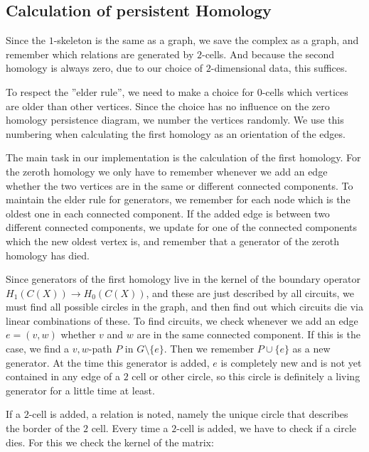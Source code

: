 \documentclass[11pt, a4paper, UKenglish]{article}
\begin{document}
    \subsection{Calculation of persistent Homology}\label{subsec:calculation-of-persistent-homology}

    Since the $1$-skeleton is the same as a graph, we save the complex as a graph, and remember which relations are generated by $2$-cells.
    And because the second homology is always zero, due to our choice of $2$-dimensional data, this suffices.

    To respect the ''elder rule'', we need to make a choice for $0$-cells which vertices are older than other vertices.
    Since the choice has no influence on the zero homology persistence diagram, we number the vertices randomly.
    We use this numbering when calculating the first homology as an orientation of the edges.

    The main task in our implementation is the calculation of the first homology.
    For the zeroth homology we only have to remember whenever we add an edge whether the two vertices are in the same or different connected components.
    To maintain the elder rule for generators, we remember for each node which is the oldest one in each connected component.
    If the added edge is between two different connected components, we update for one of the connected components which the new oldest vertex is, and remember that a generator of the zeroth homology has died.

    Since generators of the first homology live in the kernel of the boundary operator $H_1(C(X))\rightarrow H_0(C(X))$, and these are just described by all circuits, we must find all possible circles in the graph, and then find out which circuits die via linear combinations of these.
    To find circuits, we check whenever we add an edge $e=(v,w)$ whether $v$ and $w$ are in the same connected component.
    If this is the case, we find a $v,w$-path $P$ in $G\setminus \{e\}$.
    Then we remember $P\cup \{e\}$ as a new generator.
    At the time this generator is added, $e$ is completely new and is not yet contained in any edge of a $2$ cell or other circle, so this circle is definitely a living generator for a little time at least.

    If a $2$-cell is added, a relation is noted, namely the unique circle that describes the border of the $2$ cell.
    Every time a $2$-cell is added, we have to check if a circle dies.
    For this we check the kernel of the matrix:
\end{document}
